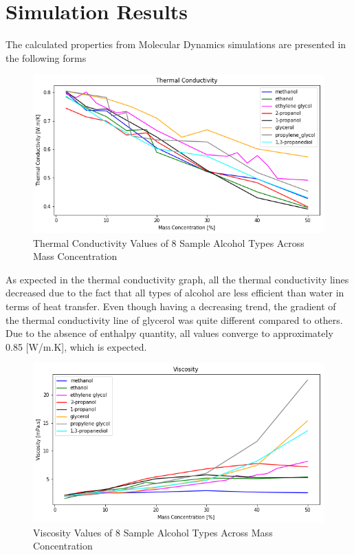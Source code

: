 \section{Simulation Results}
The calculated properties from Molecular Dynamics simulations are presented 
in the following forms
\begin{figure}[h!]
    \includegraphics[width=1\textwidth]{tc.png}
    \centering
    \captionsetup{justification=centering}
    \caption{Thermal Conductivity Values of 8 Sample Alcohol Types Across Mass Concentration}
\end{figure}

As expected in the thermal conductivity graph, all the thermal conductivity 
lines decreased due to the fact that all types of alcohol are less efficient 
than water in terms of heat transfer. Even though having a decreasing trend, 
the gradient of the thermal conductivity line of glycerol was quite different 
compared to others. Due to the absence of enthalpy quantity, all values 
converge to approximately 0.85 [W/m.K], which is expected.
\begin{figure}[h]
    \includegraphics[width=1\textwidth]{visc.png}
    \centering
    \captionsetup{justification=centering}
    \caption{Viscosity Values of 8 Sample Alcohol Types Across Mass Concentration}
\end{figure}


